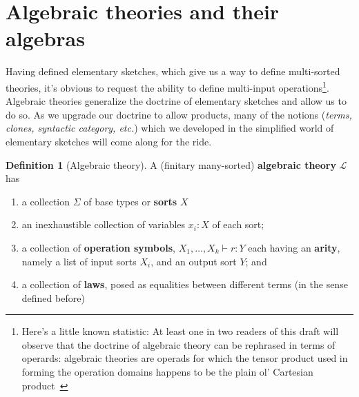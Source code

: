 \documentclass[12pt,twoside]{reedthesis}
\theoremstyle{definition}
\newtheorem{definition}{Definition}
\theoremstyle{remark}
\theoremstyle{plain}
\begin{document}
\section{Algebraic theories and their algebras}
Having defined elementary sketches, which give us a way to define multi-sorted
theories, it's obvious to request the ability to define multi-input
operations\footnote{Here's a little known statistic: At least one in two readers
  of this draft will observe that the doctrine of algebraic theory can be
  rephrased in terms of operards: algebraic theories are operads for which the
  tensor product used in forming the operation domains happens to be the plain
  ol' Cartesian product~\cite{TODO: Nlab}}. Algebraic theories generalize the
doctrine of elementary sketches and allow us to do so. As we upgrade our
doctrine to allow products, many of the notions (\emph{terms, clones, syntactic
  category, etc.}) which we developed in the simplified world of elementary
sketches will come along for the ride.

\begin{definition}[Algebraic theory]\label{def:alg theory}
  A (finitary many-sorted) \textbf{algebraic theory} $\mathcal{L}$ has
  \begin{enumerate}
    \item a collection $\Sigma$ of base types or \textbf{sorts} $X$
    \item an inexhaustible collection of variables $x_{i}:X$ of each sort;
    \item a collection of \textbf{operation symbols},
          $X_{1},\dots , X_{k} \vdash r : Y$ each having an \textbf{arity}, namely a
          list of input sorts $X_{i}$, and an output sort $Y$; and
    \item a collection of \textbf{laws}, posed as equalities between different
          terms (in the sense defined before)
  \end{enumerate}
\end{definition}
\end{document}
